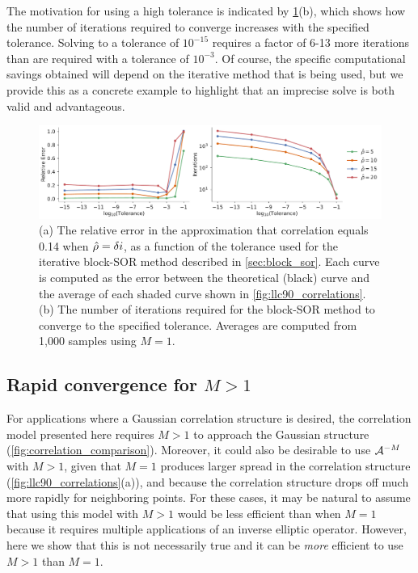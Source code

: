 The motivation for using a high tolerance is indicated by
\cref{fig:error_and_iters}(b), which shows how the number of iterations required
to converge increases with the specified tolerance.
Solving to a tolerance of $10^{-15}$ requires a factor of 6-13
more iterations than are required with a tolerance of $10^{-3}$.
Of course, the specific computational savings obtained will depend on the
iterative method that is being used, but we provide this as a concrete example
to highlight that an imprecise solve is both valid and advantageous.

\begin{figure}
    \centering
    \includegraphics[width=\textwidth]{../figures/matern_llc90_error_and_iters_01apps.pdf}
    \caption{(a) The relative error in the approximation that correlation equals
        0.14 when $\hat{\rho}=\delta i$, as a function of the tolerance used
        for the iterative block-SOR method described in \cref{sec:block_sor}.
        Each curve is computed as the error between the theoretical (black)
        curve and the average of each shaded curve shown in \cref{fig:llc90_correlations}.
        (b) The number of iterations required for the block-SOR method to
        converge to the specified tolerance.
        Averages are computed from 1,000 samples using $M=1$.
    }
    \label{fig:error_and_iters}
\end{figure}

\subsection{Rapid convergence for $M>1$}
\label{ssec:iters_and_apps}

For applications where a Gaussian correlation structure is desired, the
correlation model presented here requires $M>1$ to approach the Gaussian
structure (\cref{fig:correlation_comparison}).
Moreover, it could also be desirable to use $\mathcal{A}^{-M}$ with $M>1$,
given that $M=1$ produces larger spread in the correlation structure
(\cref{fig:llc90_correlations}(a)), and because the correlation structure drops
off much more rapidly for neighboring points.
For these cases, it may be natural to assume that using this model with $M>1$
would be less efficient than when $M=1$ because it requires multiple
applications of an inverse elliptic operator.
However, here we show that this is not necessarily true and it can be
\textit{more} efficient to use $M>1$ than $M=1$.


